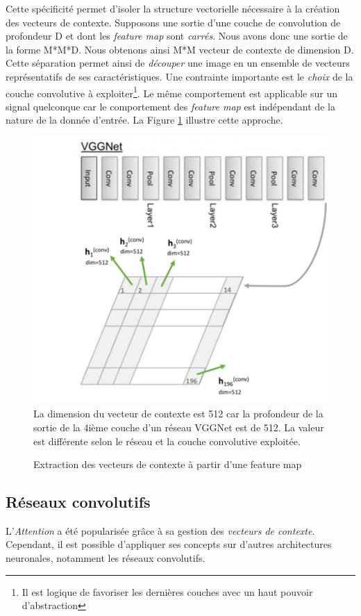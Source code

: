 \noindent Cette spécificité permet d'isoler la structure vectorielle nécessaire à la création des vecteurs de contexte. Supposons une sortie d'une couche de convolution de profondeur D et dont les \textit{feature map} sont \textit{carrés}. Nous avons donc une sortie de la forme M*M*D. Nous obtenons ainsi M*M vecteur de contexte de dimension D. Cette séparation permet ainsi de \textit{découper} une image en un ensemble de vecteurs représentatifs de ses caractéristiques. Une contrainte importante est le \textit{choix} de la couche convolutive à exploiter\footnote{Il est logique de favoriser les dernières couches avec un haut pouvoir d'abstraction}. Le même comportement est applicable sur un signal quelconque car le comportement des \textit{feature map} est indépendant de la nature de la donnée d'entrée. La Figure \ref{capim} illustre cette approche.

\begin{figure}
    \centering
    \includegraphics[scale=0.3]{./tex/attention-deep-learning/capim.png}\\
    La dimension du vecteur de contexte est 512 car la profondeur de la sortie de la 4ième couche d'un réseau VGGNet est de 512. La valeur est différente selon le réseau et la couche convolutive exploitée.
    \caption{Extraction des vecteurs de contexte à partir d'une feature map}
    \label{capim}
\end{figure}


\subsection{Réseaux convolutifs}
\noindent L'\textit{Attention} a été popularisée grâce à sa gestion des \textit{vecteurs de contexte}. Cependant, il est possible d'appliquer ses concepts sur d'autres architectures neuronales, notamment les réseaux convolutifs.\\

